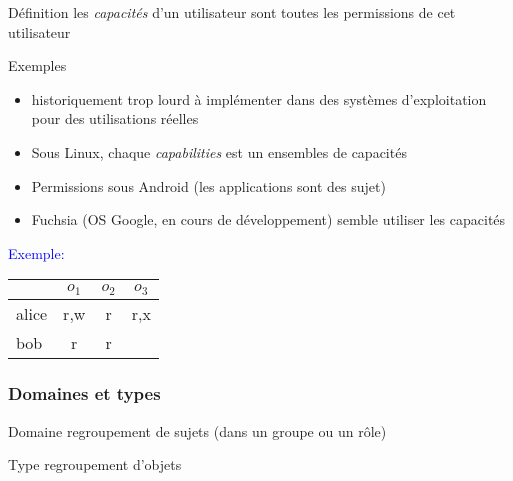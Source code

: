 \begin{reveals}
\begin{frame}[fragile]
  \vfill
  \begin{block}{Définition}
    les \emph{capacités} d'un utilisateur sont toutes les permissions de cet utilisateur
  \end{block}

  \vfill
  \begin{block}{Exemples}
    \begin{itemize}
    \item historiquement trop lourd à implémenter dans des systèmes
      d'exploitation pour des utilisations réelles
    \item Sous Linux, chaque \emph{capabilities} est un ensembles de capacités
    \item Permissions sous Android (les applications sont des sujet)
    \item Fuchsia (OS Google, en cours de développement) semble utiliser les capacités
    \end{itemize}
  \end{block}

  \vfill   

  \begin{center}
    \textcolor{blue}{Exemple:}~~~\begin{tabular}[c]{|l|c|c|c|}
      \hline\rowcolor{white}  &\(o_1\)&\(o_2\)&\(o_3\) \\
       \hline
       \firstrowcolor alice & r,w & r & r,x \\
        \hline
        \secondrowcolor bob & r & r &  \\
         \hline
    \end{tabular}
  \end{center}
\pause
  \pause

  \vfill
\end{frame}


\begin{frame}
  \frametitle{Domaines et types}

  \vfill

  \begin{block}{Domaine}
    regroupement de sujets (dans un groupe ou un rôle)
  \end{block}
  
  \vfill

  \begin{block}{Type}
    regroupement d'objets
  \end{block}
  

\end{frame}
\end{reveals}
